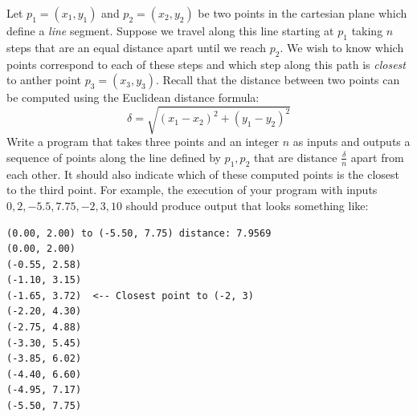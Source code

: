 \begin{exer}
Let $p_1 = (x_1, y_1)$ and $p_2 = (x_2, y_2)$ be two points in the cartesian plane
which define a \emph{line} segment. Suppose we travel along this line starting at $p_1$ 
taking $n$ steps that are an equal distance apart until we  reach $p_2$.  We wish to know 
which points correspond to each of these steps and which step along this path is \emph{closest} 
to anther point $p_3 = (x_3, y_3)$.  Recall that the distance between two points can be 
computed using the Euclidean distance formula:
  $$\delta = \sqrt{(x_1 - x_2)^2 + (y_1-y_2)^2}$$
Write a program that takes three points and an integer $n$ as inputs and
outputs a sequence of points along the line defined by $p_1, p_2$ that are distance 
$\frac{\delta}{n}$ apart from each other.  It should also indicate which of these
computed points is the closest to the third point.  For example, the execution of your program 
with inputs $0, 2, -5.5, 7.75, -2, 3, 10$
should produce output that looks something like:

\begin{verbatim}
(0.00, 2.00) to (-5.50, 7.75) distance: 7.9569
(0.00, 2.00)
(-0.55, 2.58)
(-1.10, 3.15)
(-1.65, 3.72)  <-- Closest point to (-2, 3)
(-2.20, 4.30)
(-2.75, 4.88)
(-3.30, 5.45)
(-3.85, 6.02)
(-4.40, 6.60)
(-4.95, 7.17)
(-5.50, 7.75)
\end{verbatim}
\end{exer}

